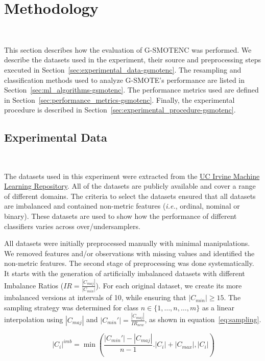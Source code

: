\section{Methodology}~\label{sec:methodology-gsmotenc}

This section describes how the evaluation of G-SMOTENC was performed. We
describe the datasets used in the experiment, their source and preprocessing
steps executed in Section~\ref{sec:experimental_data-gsmotenc}. The resampling and
classification methods used to analyze G-SMOTE's performance are listed in
Section~\ref{sec:ml_algorithms-gsmotenc}. The performance metrics used are defined in
Section~\ref{sec:performance_metrics-gsmotenc}. Finally, the experimental procedure is
described in Section~\ref{sec:experimental_procedure-gsmotenc}.

\subsection{Experimental Data}~\label{sec:experimental_data-gsmotenc}

The datasets used in this experiment were extracted from the
\href{https://archive.ics.uci.edu}{UC Irvine Machine Learning Repository}. All
of the datasets are publicly available and cover a range of different domains.
The criteria to select the datasets ensured that all datasets are imbalanced
and contained non-metric features (\textit{i.e.}, ordinal, nominal or binary).
These datasets are used to show how the performance of different
classifiers varies across over/undersamplers.

All datasets were initially preprocessed manually with minimal manipulations.
We removed features and/or observations with missing values and identified the
non-metric features. The second stage of preprocessing was done
systematically. It starts with the generation of artificially imbalanced
datasets with different Imbalance Ratios ($IR=\frac{|C_{maj}|}{|C_{min}|}$).
For each original dataset, we create its more imbalanced versions at intervals
of 10, while ensuring that $|C_{min}| \ge 15$. The sampling strategy was
determined for class $n \in \{1,\ldots,n,\ldots,m\}$ as a linear interpolation
using $|C_{maj}|$ and $|C_{min}'|=\frac{|C_{maj}|}{IR_{new}}$, as shown in
equation~\ref{eq:sampling}.

\begin{equation}~\label{eq:sampling}
    |C_i|^{imb} =
    \min(\frac{|C_{min}'|-|C_{maj}|}{n-1}.|C_i|+|C_{max}|, |C_i|)
\end{equation}

